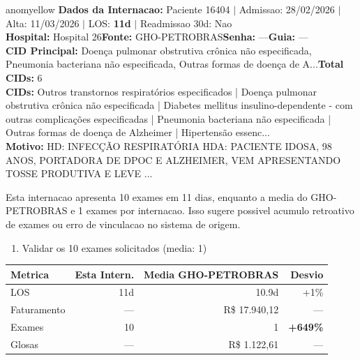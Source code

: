 \documentclass[a4paper,10pt]{article}
\begin{document}
\begin{anomalycard}[Internacao 167214 | GHO-PETROBRAS | MODERADO (z=2.66)]{anomyellow}
\textbf{Dados da Internacao:} Paciente 16404 $\mid$ Admissao: 28/02/2026 $\mid$ Alta: 11/03/2026 $\mid$ LOS: \textbf{11d} $\mid$ Readmissao 30d: Nao\\
\textbf{Hospital:} Hospital 26\quad\textbf{Fonte:} GHO-PETROBRAS\quad\textbf{Senha:} ---\quad\textbf{Guia:} ---\\
\textbf{CID Principal:} {\small Doença pulmonar obstrutiva crônica não especificada, Pneumonia bacteriana não especificada, Outras formas de doença de A...}\quad\textbf{Total CIDs:} 6\\

\textbf{CIDs:} {\scriptsize Outros transtornos respiratórios especificados | Doença pulmonar obstrutiva crônica não especificada | Diabetes mellitus insulino-dependente - com outras complicações especificadas | Pneumonia bacteriana não especificada | Outras formas de doença de Alzheimer | Hipertensão essenc...}\\

\textbf{Motivo:} {\scriptsize HD: INFECÇÃO RESPIRATÓRIA  HDA: PACIENTE IDOSA, 98 ANOS, PORTADORA DE DPOC E ALZHEIMER, VEM APRESENTANDO TOSSE PRODUTIVA E LEVE ...}\\

\vspace{2pt}\begin{tcolorbox}[colback=severityred!20,colframe=anomyellow,title={\textbf{Interpretacao de Negocio}},fonttitle=\bfseries\small,left=4pt,right=4pt,top=3pt,bottom=3pt]
{\small Esta internacao apresenta 10 exames em 11 dias, enquanto a media do GHO-PETROBRAS e 1 exames por internacao. Isso sugere possivel acumulo retroativo de exames ou erro de vinculacao no sistema de origem.}
\end{tcolorbox}
\begin{tcolorbox}[colback=severityyellow!30,colframe=anomorange,title={\textbf{Recomendacoes Especificas}},fonttitle=\bfseries\small,left=4pt,right=4pt,top=3pt,bottom=3pt]
\begin{enumerate}[nosep,leftmargin=16pt]
\item {\small Validar os 10 exames solicitados (media: 1)}
\end{enumerate}
\end{tcolorbox}
\begin{center}\begin{tabular}{l r r r}\toprule\textbf{Metrica} & \textbf{Esta Intern.} & \textbf{Media GHO-PETROBRAS} & \textbf{Desvio} \\\midrule
LOS & 11d & 10.9d & +1\% \\
Faturamento & --- & R\$ 17.940,12 & --- \\
Exames & 10 & 1 & \textcolor{anomred}{\textbf{+649\%}} \\
Glosas & --- & R\$ 1.122,61 & --- \\
\bottomrule\end{tabular}\end{center}


\end{anomalycard}
\end{document}

